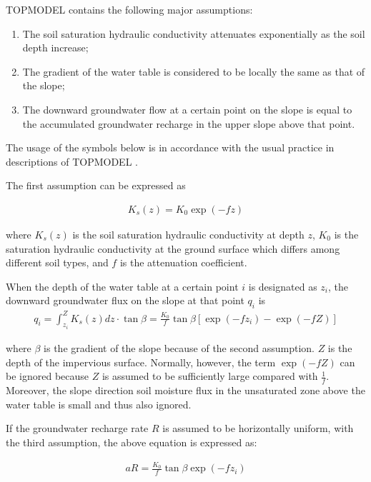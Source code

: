 TOPMODEL contains the following major assumptions:

\begin{enumerate}
\def\labelenumi{\arabic{enumi}.}
\tightlist
\item
  The soil saturation hydraulic conductivity attenuates exponentially as the soil depth increase;
\item
  The gradient of the water table is considered to be locally the same as that of the slope;
\item
  The downward groundwater flow at a certain point on the slope is equal to the accumulated groundwater recharge in the upper slope above that point.
\end{enumerate}

The usage of the symbols below is in accordance with the usual practice in descriptions of TOPMODEL \citep{Sivapalan1987-dq, Stieglitz1997-sk}.

The first assumption can be expressed as

\begin{eqnarray}
K_s(z) = K_0 \exp (-f z)
\label{eq261}
\end{eqnarray}

where \(K_s(z)\) is the soil saturation hydraulic conductivity at depth \(z\), \(K_0\) is the saturation hydraulic conductivity at the ground surface which differs among different soil types, and
\(f\) is the attenuation coefficient.

When the depth of the water table at a certain point \(i\) is designated as \(z_i\), the downward groundwater flux on the slope at that point \(q_i\) is \begin{eqnarray}
q_i = \int_{z_i}^Z K_s(z) dz \cdot \tan\beta
   = \frac{K_0}{f}  \tan\beta [\exp(-f z_i) - \exp(-f Z)] \label{eq262}
\end{eqnarray}

where \(\beta\) is the gradient of the slope because of the second assumption. \(Z\) is the depth of the impervious surface. Normally, however, the term \(\exp(-f Z)\) can be ignored because \(Z\) is
assumed to be sufficiently large compared with \(\frac1f\). Moreover, the slope direction soil moisture flux in the unsaturated zone above the water table is small and thus also ignored.

If the groundwater recharge rate \(R\) is assumed to be horizontally uniform, with the third assumption, the above equation is expressed as:

\begin{eqnarray}
a R = \frac{K_0}{f} \tan\beta \exp(-f z_i)
\label{eq263}
\end{eqnarray}

